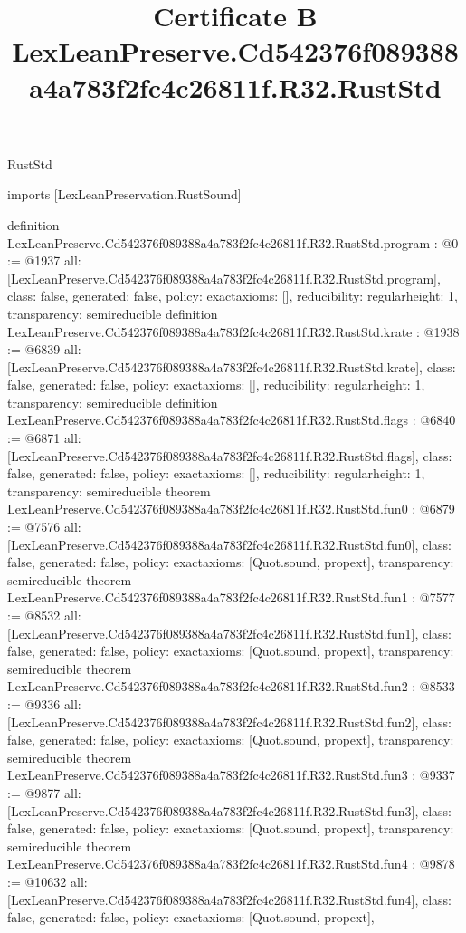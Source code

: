 \begin{lexlean}{RustStd}
\title{Certificate B LexLeanPreserve.Cd542376f089388a4a783f2fc4c26811f.R32.RustStd}
\begin{coremodule}
imports [LexLeanPreservation.RustSound]

definition LexLeanPreserve.Cd542376f089388a4a783f2fc4c26811f.R32.RustStd.program : @0 := @1937 {
  all: [LexLeanPreserve.Cd542376f089388a4a783f2fc4c26811f.R32.RustStd.program],
  class: false,
  generated: false,
  policy: exact{axioms: []},
  reducibility: regular{height: 1},
  transparency: semireducible
}
definition LexLeanPreserve.Cd542376f089388a4a783f2fc4c26811f.R32.RustStd.krate : @1938 := @6839 {
  all: [LexLeanPreserve.Cd542376f089388a4a783f2fc4c26811f.R32.RustStd.krate],
  class: false,
  generated: false,
  policy: exact{axioms: []},
  reducibility: regular{height: 1},
  transparency: semireducible
}
definition LexLeanPreserve.Cd542376f089388a4a783f2fc4c26811f.R32.RustStd.flags : @6840 := @6871 {
  all: [LexLeanPreserve.Cd542376f089388a4a783f2fc4c26811f.R32.RustStd.flags],
  class: false,
  generated: false,
  policy: exact{axioms: []},
  reducibility: regular{height: 1},
  transparency: semireducible
}
theorem LexLeanPreserve.Cd542376f089388a4a783f2fc4c26811f.R32.RustStd.fun0 : @6879 := @7576 {
  all: [LexLeanPreserve.Cd542376f089388a4a783f2fc4c26811f.R32.RustStd.fun0],
  class: false,
  generated: false,
  policy: exact{axioms: [Quot.sound, propext]},
  transparency: semireducible
}
theorem LexLeanPreserve.Cd542376f089388a4a783f2fc4c26811f.R32.RustStd.fun1 : @7577 := @8532 {
  all: [LexLeanPreserve.Cd542376f089388a4a783f2fc4c26811f.R32.RustStd.fun1],
  class: false,
  generated: false,
  policy: exact{axioms: [Quot.sound, propext]},
  transparency: semireducible
}
theorem LexLeanPreserve.Cd542376f089388a4a783f2fc4c26811f.R32.RustStd.fun2 : @8533 := @9336 {
  all: [LexLeanPreserve.Cd542376f089388a4a783f2fc4c26811f.R32.RustStd.fun2],
  class: false,
  generated: false,
  policy: exact{axioms: [Quot.sound, propext]},
  transparency: semireducible
}
theorem LexLeanPreserve.Cd542376f089388a4a783f2fc4c26811f.R32.RustStd.fun3 : @9337 := @9877 {
  all: [LexLeanPreserve.Cd542376f089388a4a783f2fc4c26811f.R32.RustStd.fun3],
  class: false,
  generated: false,
  policy: exact{axioms: [Quot.sound, propext]},
  transparency: semireducible
}
theorem LexLeanPreserve.Cd542376f089388a4a783f2fc4c26811f.R32.RustStd.fun4 : @9878 := @10632 {
  all: [LexLeanPreserve.Cd542376f089388a4a783f2fc4c26811f.R32.RustStd.fun4],
  class: false,
  generated: false,
  policy: exact{axioms: [Quot.sound, propext]},
}
\end{coremodule}
\end{lexlean}
